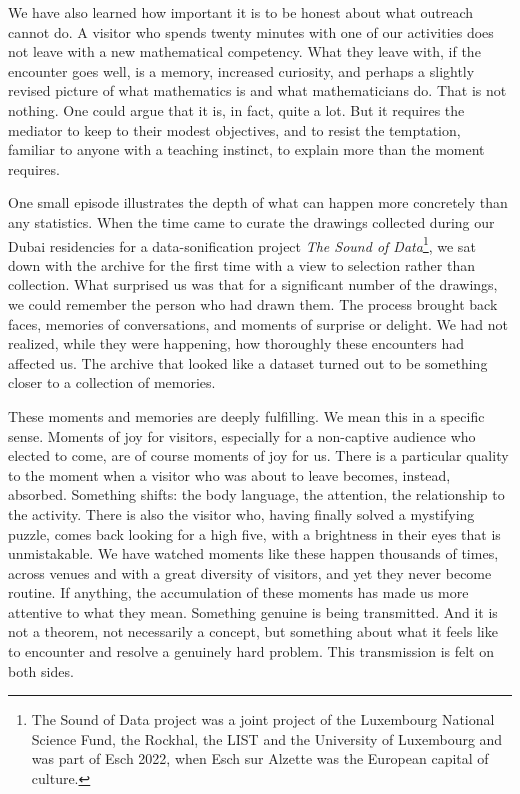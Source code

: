 \documentclass{notices}
\begin{document}
We have also learned how important it is to be honest about what outreach cannot do. A visitor who spends twenty minutes with one of our activities does not leave with a new mathematical competency. What they leave with, if the encounter goes well, is a memory, increased curiosity, and perhaps a slightly revised picture of what mathematics is and what mathematicians do. That is not nothing. One could argue that it is, in fact, quite a lot. But it requires the mediator to keep to their modest objectives, and to resist the temptation, familiar to anyone with a teaching instinct, to explain more than the moment requires.

One small episode illustrates the depth of what can happen more concretely than any statistics. When the time came to curate the drawings collected during our Dubai residencies for a data-sonification project \textit{The Sound of Data}\footnote{The Sound of Data project was a joint project of the Luxembourg National Science Fund, the Rockhal, the LIST and the University of Luxembourg and was part of Esch 2022, when Esch sur Alzette was the European capital of culture.}, we sat down with the archive for the first time with a view to selection rather than collection. What surprised us was that for a significant number of the drawings, we could remember the person who had drawn them. The process brought back faces, memories of conversations, and moments of surprise or delight. We had not realized, while they were happening, how thoroughly these encounters had affected us. The archive that looked like a dataset turned out to be something closer to a collection of memories.

These moments and memories are deeply fulfilling. We mean this in a specific sense. Moments of joy for visitors, especially for a non-captive audience who elected to come, are of course moments of joy for us. There is a particular quality to the moment when a visitor who was about to leave becomes, instead, absorbed. Something shifts: the body language, the attention, the relationship to the activity. There is also the visitor who, having finally solved a mystifying puzzle, comes back looking for a high five, with a brightness in their eyes that is unmistakable. We have watched moments like these happen thousands of times, across venues and with a great diversity of visitors, and yet they never become routine. If anything, the accumulation of these
moments has made us more attentive to what they mean. Something genuine is being transmitted. And it is not a theorem, not necessarily a concept, but something about what it feels like to encounter and resolve a genuinely hard problem. This transmission is felt on both sides.
\end{document}
